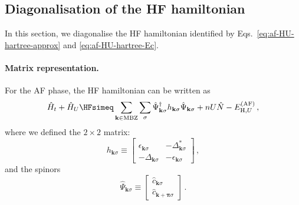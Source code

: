 \subsection{Diagonalisation of the HF hamiltonian}\label{subsec:af-hm-diagonalisation}

In this section, we diagonalise the HF hamiltonian identified by Eqs.~\eqref{eq:af-HU-hartree-approx} and \eqref{eq:af-HU-hartree-Ec}.

\paragraph{Matrix representation.}

For the AF phase, the HF hamiltonian can be written as
\begin{equation}\label{eq:af-HM-hk}
	\hat H_t + \hat H_U \HFsimeq \sum_{\mathbf{k} \in \mathrm{MBZ}} \sum_\sigma \hat \Psi_{\mathbf{k}\sigma}^\dagger h_{\mathbf{k}\sigma} \hat \Psi_{\mathbf{k}\sigma} + nU \hat N -  E_{\mathrm{H},U}^{(\mathrm{AF})} \, ,
\end{equation}
where we defined the $2 \times 2$ matrix:
\begin{equation}\label{eq:af-hk}
	h_{\mathbf{k}\sigma} \equiv \begin{bmatrix}
		\epsilon_{\mathbf{k}\sigma} & -\Delta_{\mathbf{k}\sigma}^* \\
		-\Delta_{\mathbf{k}\sigma} & - \epsilon_{\mathbf{k}\sigma}
	\end{bmatrix} \, ,
\end{equation}
and the spinors
\begin{equation}\label{eq:af-Psi-def}
	\hat \Psi_{\mathbf{k}\sigma} \equiv \begin{bmatrix}
		\hat c_{\mathbf{k}\sigma} \\
		\hat c_{\mathbf{k}+\bm{\pi}\sigma} 
	\end{bmatrix} \, .
\end{equation}

